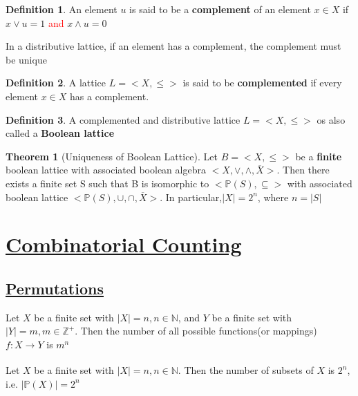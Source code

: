 \documentclass{article}
\theoremstyle{definition}
\newtheorem*{defi}{Definition}
\theoremstyle{definition}
\newenvironment{manualprop}[1]{%
  \renewcommand\themanualpropinner{#1}%
  \manualpropinner
}{\endmanualpropinner}
\newenvironment{manualcoro}[1]{%
  \renewcommand\themanualcoroinner{#1}%
  \manualcoroinner
}{\endmanualcoroinner}
\theoremstyle{named}
\newtheorem*{namedtheorem}{Theorem}
\begin{document}
\begin{defi}
An element $u$ is said to be a \textbf{complement} of an element $x \in X$ if $x \vee u = 1$ \textcolor{red}{and} $x \wedge u = 0$ 
\end{defi}

\begin{manualprop}{13}
In a distributive lattice, if an element has a complement, the complement must be unique
\end{manualprop}

\begin{defi}
A lattice $L = <X, \leq>$ is said to be \textbf{complemented} if every element $x \in X$ has a complement.
\end{defi}

\begin{defi}
A complemented and distributive lattice $L = <X, \leq>$ os also called a \textbf{Boolean lattice}
\end{defi}

\begin{namedtheorem}[Uniqueness of Boolean Lattice]
Let $B = <X, \leq>$ be a \textbf{finite} boolean lattice with associated boolean algebra $<X, \vee, \wedge, \overline{X}>$. Then there exists a finite set S such that B is isomorphic to $<\mathbb{P}(S), \subseteq>$ with associated boolean lattice $<\mathbb{P}(S), \cup, \cap, \overline{X}>$. In particular,$|X| = 2^n$, where $n = |S|$
\end{namedtheorem}


\section{\underline{Combinatorial Counting}}
\subsection{\underline{Permutations}}
\begin{manualprop}{14}
Let $X$ be a finite set with $|X| = n, n \in \mathbb{N}$, and $Y$ be a finite set with $|Y| = m, m \in \mathbb{Z^{+}}$. Then the number of all possible functions(or mappings) $f: X \xrightarrow[]{} Y$ is $m^n$
\end{manualprop}

\begin{manualcoro}{14.1}
Let $X$ be a finite set with $|X| = n, n \in \mathbb{N}$. Then the number of subsets of $X$ is $2^n$, i.e. $|\mathbb{P}(X)| = 2^n$
\end{manualcoro}
\end{document}
